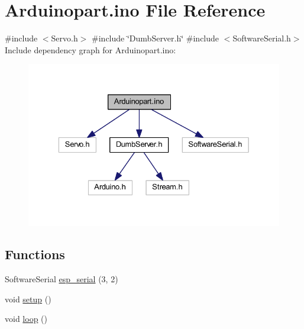 \hypertarget{_arduinopart_8ino}{}\section{Arduinopart.\+ino File Reference}
\label{_arduinopart_8ino}
{\ttfamily \#include $<$Servo.\+h$>$}\newline
{\ttfamily \#include \char`\"{}Dumb\+Server.\+h\char`\"{}}\newline
{\ttfamily \#include $<$Software\+Serial.\+h$>$}\newline
Include dependency graph for Arduinopart.\+ino\+:\nopagebreak
\begin{figure}[H]
\begin{center}
\leavevmode
\includegraphics[width=329pt]{_arduinopart_8ino__incl}
\end{center}
\end{figure}
\subsection*{Functions}
\begin{DoxyCompactItemize}
\item 
Software\+Serial \mbox{\hyperlink{_arduinopart_8ino_af690b3a6882292855c4091ede8039998}{esp\+\_\+serial}} (3, 2)
\item 
void \mbox{\hyperlink{_arduinopart_8ino_a4fc01d736fe50cf5b977f755b675f11d}{setup}} ()
\item 
void \mbox{\hyperlink{_arduinopart_8ino_afe461d27b9c48d5921c00d521181f12f}{loop}} ()
\end{DoxyCompactItemize}
